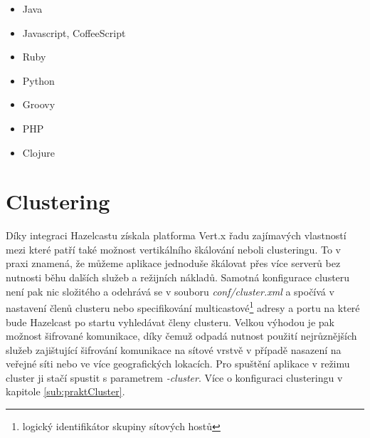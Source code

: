 \begin{itemize}
\item{Java}
\item{Javascript, CoffeeScript}
\item{Ruby}
\item{Python}
\item{Groovy}
\item{PHP}
\item{Clojure}
\end{itemize}

\section{Clustering}

Díky integraci Hazelcastu získala platforma Vert.x řadu zajímavých vlastností mezi které patří také možnost vertikálního škálování neboli clusteringu. To v praxi znamená, že můžeme aplikace jednoduše škálovat přes více serverů bez nutnosti běhu dalších služeb a režijních nákladů. Samotná konfigurace clusteru není pak nic složitého a odehrává se v souboru \emph{conf/cluster.xml} a spočívá v nastavení členů clusteru nebo specifikování multicastové\footnote{logický identifikátor skupiny sítových hostů} adresy a portu na které bude Hazelcast po startu vyhledávat členy clusteru. Velkou výhodou je pak možnost šifrované komunikace, díky čemuž odpadá nutnost použití nejrůznějších služeb zajištující šifrování komunikace na sítové vrstvě v případě nasazení na veřejné síti nebo ve více geografických lokacích. Pro spuštění aplikace v režimu cluster ji stačí spustit s parametrem \emph{-cluster}. Více o konfiguraci clusteringu v kapitole \ref{sub:praktCluster}.

